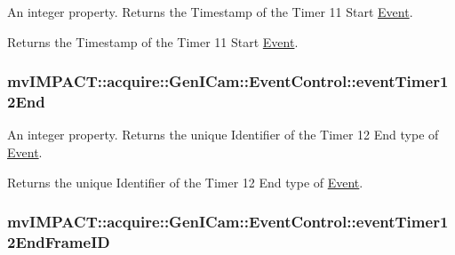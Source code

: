 An integer property. Returns the Timestamp of the Timer 11 Start \hyperlink{classmv_i_m_p_a_c_t_1_1acquire_1_1_event}{Event}. 

Returns the Timestamp of the Timer 11 Start \hyperlink{classmv_i_m_p_a_c_t_1_1acquire_1_1_event}{Event}. \hypertarget{classmv_i_m_p_a_c_t_1_1acquire_1_1_gen_i_cam_1_1_event_control_a916b3eef2efa19420850a9960d78224a}{
\subsubsection[{event\+Timer12\+End}]{ mv\+I\+M\+P\+A\+C\+T\+::acquire\+::\+Gen\+I\+Cam\+::\+Event\+Control\+::event\+Timer12\+End}}\label{classmv_i_m_p_a_c_t_1_1acquire_1_1_gen_i_cam_1_1_event_control_a916b3eef2efa19420850a9960d78224a}


An integer property. Returns the unique Identifier of the Timer 12 End type of \hyperlink{classmv_i_m_p_a_c_t_1_1acquire_1_1_event}{Event}. 

Returns the unique Identifier of the Timer 12 End type of \hyperlink{classmv_i_m_p_a_c_t_1_1acquire_1_1_event}{Event}. \hypertarget{classmv_i_m_p_a_c_t_1_1acquire_1_1_gen_i_cam_1_1_event_control_a69d78e5cbc0c5d9ba31f5a952032000f}{
\subsubsection[{event\+Timer12\+End\+Frame\+I\+D}]{ mv\+I\+M\+P\+A\+C\+T\+::acquire\+::\+Gen\+I\+Cam\+::\+Event\+Control\+::event\+Timer12\+End\+Frame\+I\+D}}\label{classmv_i_m_p_a_c_t_1_1acquire_1_1_gen_i_cam_1_1_event_control_a69d78e5cbc0c5d9ba31f5a952032000f}


